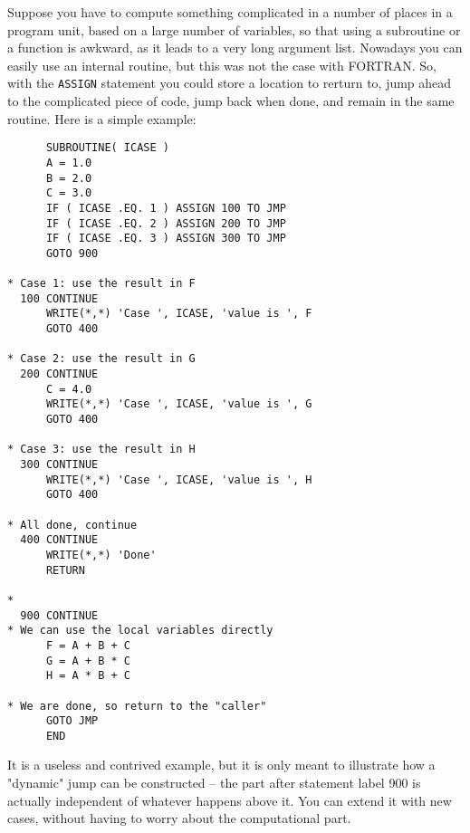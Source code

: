 \noindent Suppose you have to compute something complicated in a number of places in a
program unit, based on a large number of variables, so that using a subroutine or
a function is awkward, as it leads to a very long argument list. Nowadays you
can easily use an internal routine, but this was not the case with FORTRAN.
So, with the \verb+ASSIGN+ statement you could store a location to rerturn to,
jump ahead to the complicated piece of code, jump back when done, and remain in
the same routine. Here is a simple example:
%
\begin{verbatim}
      SUBROUTINE( ICASE )
      A = 1.0
      B = 2.0
      C = 3.0
      IF ( ICASE .EQ. 1 ) ASSIGN 100 TO JMP
      IF ( ICASE .EQ. 2 ) ASSIGN 200 TO JMP
      IF ( ICASE .EQ. 3 ) ASSIGN 300 TO JMP
      GOTO 900

* Case 1: use the result in F
  100 CONTINUE
      WRITE(*,*) 'Case ', ICASE, 'value is ', F
      GOTO 400

* Case 2: use the result in G
  200 CONTINUE
      C = 4.0
      WRITE(*,*) 'Case ', ICASE, 'value is ', G
      GOTO 400

* Case 3: use the result in H
  300 CONTINUE
      WRITE(*,*) 'Case ', ICASE, 'value is ', H
      GOTO 400

* All done, continue
  400 CONTINUE
      WRITE(*,*) 'Done'
      RETURN

*
  900 CONTINUE
* We can use the local variables directly
      F = A + B + C
      G = A + B * C
      H = A * B + C

* We are done, so return to the "caller"
      GOTO JMP
      END
\end{verbatim}

It is a useless and contrived example, but it is only meant to illustrate how
a "dynamic" jump can be constructed -- the part after statement label 900
is actually independent of whatever happens above it. You can extend it with
new cases, without having to worry about the computational part.
